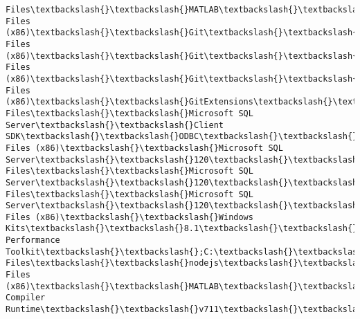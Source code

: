 \documentclass[11pt]{article}
\begin{document}
\begin{Verbatim}[commandchars=\\\{\}]
Files\textbackslash{}\textbackslash{}MATLAB\textbackslash{}\textbackslash{}R2016b\textbackslash{}\textbackslash{}polyspace\textbackslash{}\textbackslash{}bin;C:\textbackslash{}\textbackslash{}Program Files (x86)\textbackslash{}\textbackslash{}Git\textbackslash{}\textbackslash{}cmd;C:\textbackslash{}\textbackslash{}Program Files (x86)\textbackslash{}\textbackslash{}Git\textbackslash{}\textbackslash{}mingw32\textbackslash{}\textbackslash{}bin;C:\textbackslash{}\textbackslash{}Program Files (x86)\textbackslash{}\textbackslash{}Git\textbackslash{}\textbackslash{}usr\textbackslash{}\textbackslash{}bin;C:\textbackslash{}\textbackslash{}Program Files (x86)\textbackslash{}\textbackslash{}GitExtensions\textbackslash{}\textbackslash{};C:\textbackslash{}\textbackslash{}WINDOWS\textbackslash{}\textbackslash{}system32;C:\textbackslash{}\textbackslash{}WINDOWS;C:\textbackslash{}\textbackslash{}WINDOWS\textbackslash{}\textbackslash{}System32\textbackslash{}\textbackslash{}Wbem;C:\textbackslash{}\textbackslash{}WINDOWS\textbackslash{}\textbackslash{}System32\textbackslash{}\textbackslash{}WindowsPowerShell\textbackslash{}\textbackslash{}v1.0\textbackslash{}\textbackslash{};C:\textbackslash{}\textbackslash{}Program Files\textbackslash{}\textbackslash{}Microsoft SQL Server\textbackslash{}\textbackslash{}Client SDK\textbackslash{}\textbackslash{}ODBC\textbackslash{}\textbackslash{}110\textbackslash{}\textbackslash{}Tools\textbackslash{}\textbackslash{}Binn\textbackslash{}\textbackslash{};C:\textbackslash{}\textbackslash{}Program Files (x86)\textbackslash{}\textbackslash{}Microsoft SQL Server\textbackslash{}\textbackslash{}120\textbackslash{}\textbackslash{}Tools\textbackslash{}\textbackslash{}Binn\textbackslash{}\textbackslash{};C:\textbackslash{}\textbackslash{}Program Files\textbackslash{}\textbackslash{}Microsoft SQL Server\textbackslash{}\textbackslash{}120\textbackslash{}\textbackslash{}Tools\textbackslash{}\textbackslash{}Binn\textbackslash{}\textbackslash{};C:\textbackslash{}\textbackslash{}Program Files\textbackslash{}\textbackslash{}Microsoft SQL Server\textbackslash{}\textbackslash{}120\textbackslash{}\textbackslash{}DTS\textbackslash{}\textbackslash{}Binn\textbackslash{}\textbackslash{};C:\textbackslash{}\textbackslash{}Program Files (x86)\textbackslash{}\textbackslash{}Windows Kits\textbackslash{}\textbackslash{}8.1\textbackslash{}\textbackslash{}Windows Performance Toolkit\textbackslash{}\textbackslash{};C:\textbackslash{}\textbackslash{}Program Files\textbackslash{}\textbackslash{}nodejs\textbackslash{}\textbackslash{};C:\textbackslash{}\textbackslash{}CIFER\_Student\textbackslash{}\textbackslash{}bin;C:\textbackslash{}\textbackslash{}CIFER\_Student\textbackslash{}\textbackslash{}bin;C:\textbackslash{}\textbackslash{}Program Files (x86)\textbackslash{}\textbackslash{}MATLAB\textbackslash{}\textbackslash{}MATLAB Compiler Runtime\textbackslash{}\textbackslash{}v711\textbackslash{}\textbackslash{}runtime\textbackslash{}\textbackslash{}win32;C:\textbackslash{}\textbackslash{}Program 
\end{Verbatim}
\end{document}
